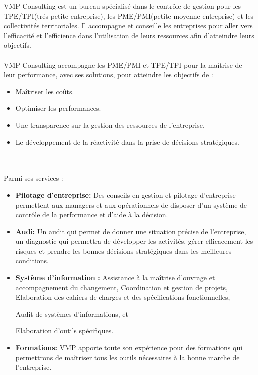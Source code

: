 \documentclass[12pt]{article}
\begin{document}
VMP-Consulting est un bureau spécialisé dans le contrôle de gestion pour les TPE/TPI(trés petite entreprise), les PME/PMI(petite moyenne entreprise) et les collectivités territoriales. Il  accompagne et  conseille  les entreprises pour aller vers l'efficacité et l'efficience dans l'utilisation de leurs ressources afin d'atteindre leurs objectifs.\\ \\


VMP Consulting accompagne les PME/PMI et TPE/TPI pour la maîtrise de leur performance, avec ses solutions, pour atteindre les objectifs de :
\begin{itemize}

\item Maîtriser les coûts.

\item Optimiser les performances.

\item Une transparence sur la gestion des ressources de  l'entreprise.

\item Le développement de la réactivité dans la prise de décisions stratégiques.
\end{itemize}
\\ \\ 


Parmi ses services :
\begin{itemize}

\item \textbf{Pilotage d'entreprise: } Des conseils en gestion et pilotage d'entreprise permettent aux managers et aux opérationnels de disposer d’un système de contrôle de la performance et d’aide à la décision.


\item \textbf{Audi: } Un audit qui permet de donner une situation précise de l'entreprise, un
diagnostic qui  permettra de développer les activités, gérer efficacement les risques et prendre les bonnes décisions stratégiques dans les meilleures conditions.


\item \textbf{Système d'information : }  Assistance à la maîtrise d’ouvrage et accompagnement du changement,
 Coordination et gestion de projets, 
 Elaboration des cahiers de charges et des spécifications fonctionnelles, 

 Audit de systèmes d’informations, et

Elaboration d’outils spécifiques.


\item \textbf{Formations: } VMP apporte toute son expérience pour des formations qui permettrons de maîtriser tous les outils nécessaires à la bonne marche de l'entreprise.
\end{itemize}
\\ \\ 
\end{document}

